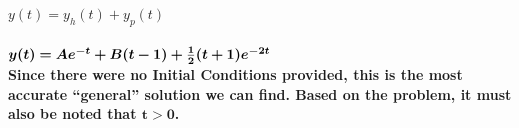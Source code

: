 \documentclass{article}
\begin{document}
\begin{enumerate}
\begin{enumerate}
$y(t) = y_h(t) + y_p(t)$\\\\
$\bm{y(t) = A{e^{-t}} + B(t-1) + {1\over2}(t+1)e^{-2t}}$\\
\textbf{Since there were no Initial Conditions provided, this is the most accurate ``general'' solution we can find. Based on the problem, it must also be noted that $\bm{t>0}$.}\\


\end{enumerate}

\end{enumerate}
\end{document}
